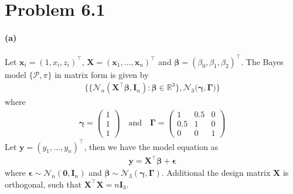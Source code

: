 \section{Problem 6.1}
\paragraph{(a)}
Let $\bm{x}_i = (1, x_i, z_i)^{\top}$, $\bm{X} = (\bm{x}_1, \dots, \bm{x}_n)^\top$ and $\bm{\beta} = (\beta_0, \beta_1, \beta_2)^{\top}$. The Bayes model $\{\mathcal{P}, \pi\}$ in matrix form is given by
\begin{align*}
    \{ \{ \mathcal{N}_n(\bm{X}^{\top}\bm{\beta}, \bm{I}_n): \bm{\beta}\in \mathbb{R}^{3}\},
    \mathcal{N}_3(\bm{\gamma}, \bm{\Gamma)} \}
\end{align*}
where
\begin{align*}
    \bm{\gamma} =
    \begin{pmatrix}
        1\\
        1\\
        1
    \end{pmatrix} \quad \text{and} \quad
    \bm{\Gamma} =
    \begin{pmatrix}
    1&0.5&0\\
    0.5&1&0\\
    0&0&1
    \end{pmatrix}
\end{align*}
Let $\bm{y} = (y_1, \dots, y_n)^\top$, then we have the model equation as
\begin{align*}
    \bm{y} = \bm{X}^{\top}\bm{\beta} + \bm{\epsilon}
\end{align*}
where $\bm{\epsilon} \sim \mathcal{N}_n(\bm{0}, \bm{I}_n)$ and $\bm{\beta} \sim \mathcal{N}_3(\bm{\gamma}, \bm{\Gamma})$. Additional the design matrix $\bm{X}$ is orthogonal, such that $\bm{X}^{\top}\bm{X} = n\bm{I}_3$.

